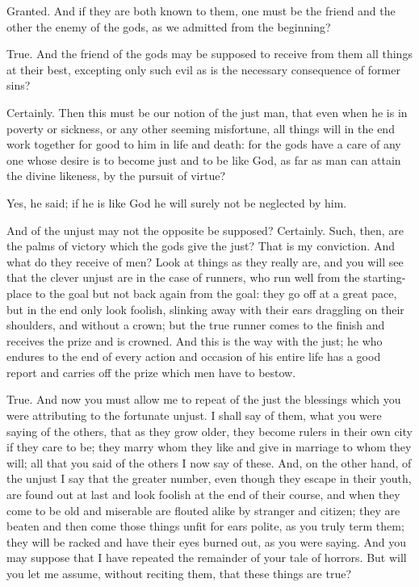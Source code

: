 Granted.
And if they are both known to them, one must be the friend and the other the enemy of the gods, as we admitted from the beginning?

True.
And the friend of the gods may be supposed to receive from them all things at their best, excepting only such evil as is the necessary consequence of former sins?

Certainly.
Then this must be our notion of the just man, that even when he is in poverty or sickness, or any other seeming misfortune, all things will in the end work together for good to him in life and death: for the gods have a care of any one whose desire is to become just and to be like God, as far as man can attain the divine likeness, by the pursuit of virtue?

Yes, he said; if he is like God he will surely not be neglected by him.

And of the unjust may not the opposite be supposed?
Certainly.
Such, then, are the palms of victory which the gods give the just?
That is my conviction.
And what do they receive of men? Look at things as they really are, and you will see that the clever unjust are in the case of runners, who run well from the starting-place to the goal but not back again from the goal: they go off at a great pace, but in the end only look foolish, slinking away with their ears draggling on their shoulders, and without a crown; but the true runner comes to the finish and receives the prize and is crowned. And this is the way with the just; he who endures to the end of every action and occasion of his entire life has a good report and carries off the prize which men have to bestow.

True.
And now you must allow me to repeat of the just the blessings which you were attributing to the fortunate unjust. I shall say of them, what you were saying of the others, that as they grow older, they become rulers in their own city if they care to be; they marry whom they like and give in marriage to whom they will; all that you said of the others I now say of these. And, on the other hand, of the unjust I say that the greater number, even though they escape in their youth, are found out at last and look foolish at the end of their course, and when they come to be old and miserable are flouted alike by stranger and citizen; they are beaten and then come those things unfit for ears polite, as you truly term them; they will be racked and have their eyes burned out, as you were saying. And you may suppose that I have repeated the remainder of your tale of horrors. But will you let me assume, without reciting them, that these things are true?

